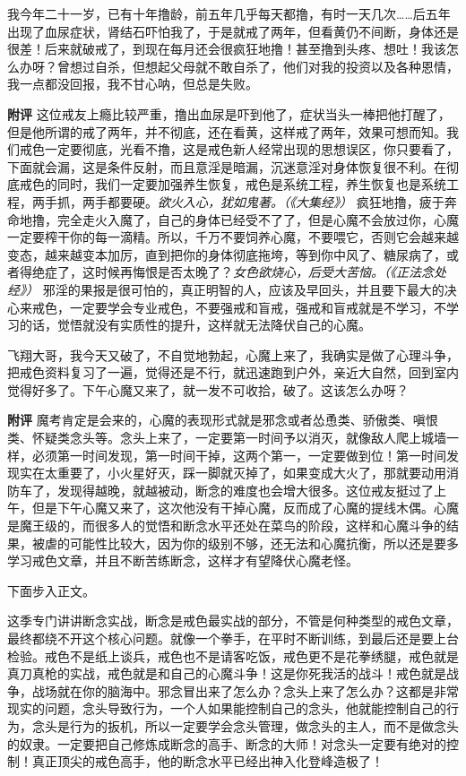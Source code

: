 \begin{case}
    我今年二十一岁，已有十年撸龄，前五年几乎每天都撸，有时一天几次……后五年出现了血尿症状，肾结石吓怕我了，于是就戒了两年，但看黄仍不间断，身体还是很差！后来就破戒了，到现在每月还会很疯狂地撸！甚至撸到头疼、想吐！我该怎么办呀？曾想过自杀，但想起父母就不敢自杀了，他们对我的投资以及各种恩情，我一点都没回报，我不甘心呐，但总是失败。

    \textbf{附评} 这位戒友上瘾比较严重，撸出血尿是吓到他了，症状当头一棒把他打醒了，但是他所谓的戒了两年，并不彻底，还在看黄，这样戒了两年，效果可想而知。我们戒色一定要彻底，光看不撸，这是戒色新人经常出现的思想误区，你只要看了，下面就会漏，这是条件反射，而且意淫是暗漏，沉迷意淫对身体恢复很不利。在彻底戒色的同时，我们一定要加强养生恢复，戒色是系统工程，养生恢复也是系统工程，两手抓，两手都要硬。\textit{欲火入心，犹如鬼著。（《大集经》）} 疯狂地撸，疲于奔命地撸，完全走火入魔了，自己的身体已经受不了了，但是心魔不会放过你，心魔一定要榨干你的每一滴精。所以，千万不要饲养心魔，不要喂它，否则它会越来越变态，越来越变本加厉，直到把你的身体彻底拖垮，等到你中风了、糖尿病了，或者得绝症了，这时候再悔恨是否太晚了？\textit{女色欲烧心，后受大苦恼。（《正法念处经》）} 邪淫的果报是很可怕的，真正明智的人，应该及早回头，并且要下最大的决心来戒色，一定要学会专业戒色，不要强戒和盲戒，强戒和盲戒就是不学习，不学习的话，觉悟就没有实质性的提升，这样就无法降伏自己的心魔。
\end{case}

\begin{case}
    飞翔大哥，我今天又破了，不自觉地勃起，心魔上来了，我确实是做了心理斗争，把戒色资料复习了一遍，觉得还是不行，就迅速跑到户外，亲近大自然，回到室内觉得好多了。下午心魔又来了，就一发不可收拾，破了。这该怎么办呀？

    \textbf{附评} 魔考肯定是会来的，心魔的表现形式就是邪念或者怂恿类、骄傲类、嗔恨类、怀疑类念头等。念头上来了，一定要第一时间予以消灭，就像敌人爬上城墙一样，必须第一时间发现，第一时间干掉，这两个第一，一定要做到位！第一时间发现实在太重要了，小火星好灭，踩一脚就灭掉了，如果变成大火了，那就要动用消防车了，发现得越晚，就越被动，断念的难度也会增大很多。这位戒友挺过了上午，但是下午心魔又来了，这次他没有干掉心魔，反而成了心魔的提线木偶。心魔是魔王级的，而很多人的觉悟和断念水平还处在菜鸟的阶段，这样和心魔斗争的结果，被虐的可能性比较大，因为你的级别不够，还无法和心魔抗衡，所以还是要多学习戒色文章，并且不断苦练断念，这样才有望降伏心魔老怪。
\end{case}

下面步入正文。

这季专门讲讲断念实战，断念是戒色最实战的部分，不管是何种类型的戒色文章，最终都绕不开这个核心问题。就像一个拳手，在平时不断训练，到最后还是要上台检验。戒色不是纸上谈兵，戒色也不是请客吃饭，戒色更不是花拳绣腿，戒色就是真刀真枪的实战，戒色就是和自己的心魔斗争！这是你死我活的战斗！戒色就是战争，战场就在你的脑海中。邪念冒出来了怎么办？念头上来了怎么办？这都是非常现实的问题，念头导致行为，一个人如果能控制自己的念头，他就能控制自己的行为，念头是行为的扳机，所以一定要学会念头管理，做念头的主人，而不是做念头的奴隶。一定要把自己修炼成断念的高手、断念的大师！对念头一定要有绝对的控制！真正顶尖的戒色高手，他的断念水平已经出神入化登峰造极了！

